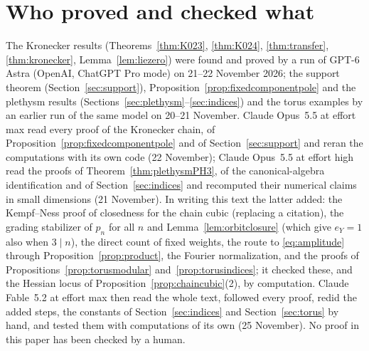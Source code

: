\section{Who proved and checked what}\label{sec:provenance}

The Kronecker results (Theorems~\ref{thm:K023}, \ref{thm:K024},
\ref{thm:transfer}, \ref{thm:kronecker}, Lemma~\ref{lem:liezero}) were found
and proved by a run of GPT-6 Astra (OpenAI, ChatGPT Pro mode) on 21--22
November 2026; the support theorem (Section~\ref{sec:support}),
Proposition~\ref{prop:fixedcomponentpole} and the plethysm results
(Sections~\ref{sec:plethysm}--\ref{sec:indices}) and the torus examples by an
earlier run of the same model on 20--21 November. Claude Opus~5.5 at effort max
read every proof of the Kronecker chain, of
Proposition~\ref{prop:fixedcomponentpole} and of Section~\ref{sec:support} and
reran the computations with its own code (22 November); Claude Opus~5.5 at
effort high read the proofs of Theorem~\ref{thm:plethysmPH3}, of the
canonical-algebra identification and of Section~\ref{sec:indices} and recomputed
their numerical claims in small dimensions (21 November). In writing this text
the latter added: the Kempf--Ness proof of closedness for the chain cubic
(replacing a citation), the grading stabilizer of $p_n$ for all $n$ and
Lemma~\ref{lem:orbitclosure} (which give $e_Y=1$ also when $3\mid n$), the
direct count of fixed weights, the route to \eqref{eq:amplitude} through
Proposition~\ref{prop:product}, the Fourier normalization, and the proofs of
Propositions~\ref{prop:torusmodular} and~\ref{prop:torusindices}; it checked
these, and the Hessian locus of Proposition~\ref{prop:chaincubic}(2), by
computation. Claude Fable~5.2 at effort max then read the whole text,
followed every proof, redid the added steps, the constants of
Section~\ref{sec:indices} and Section~\ref{sec:torus} by hand, and tested them
with computations of its own (25 November). No proof in this paper has been
checked by a human.

